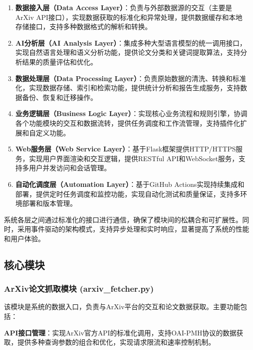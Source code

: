 \documentclass[12pt,a4paper]{article}
\begin{document}
\begin{enumerate}
    \item \textbf{数据接入层（Data Access Layer）}：负责与外部数据源的交互（主要是ArXiv API接口），实现数据获取的标准化和异常处理，提供数据缓存和本地存储接口，支持多种数据格式的解析和转换。
    
    \item \textbf{AI分析层（AI Analysis Layer）}：集成多种大型语言模型的统一调用接口，实现自然语言处理和语义分析功能，提供论文分类和关键词提取算法，支持分析结果的质量评估和优化。
    
    \item \textbf{数据处理层（Data Processing Layer）}：负责原始数据的清洗、转换和标准化，实现数据存储、索引和检索功能，提供统计分析和报告生成服务，支持数据备份、恢复和迁移操作。
    
    \item \textbf{业务逻辑层（Business Logic Layer）}：实现核心业务流程和规则引擎，协调各个功能模块的交互和数据流转，提供任务调度和工作流管理，支持插件化扩展和自定义功能。
    
    \item \textbf{Web服务层（Web Service Layer）}：基于Flask框架提供HTTP/HTTPS服务，实现用户界面渲染和交互逻辑，提供RESTful API和WebSocket服务，支持多用户并发访问和会话管理。
    
    \item \textbf{自动化调度层（Automation Layer）}：基于GitHub Actions实现持续集成和部署，提供定时任务调度和监控功能，实现自动化测试和质量保证，支持多环境部署和版本管理。
\end{enumerate}

系统各层之间通过标准化的接口进行通信，确保了模块间的松耦合和可扩展性。同时，采用事件驱动的架构模式，支持异步处理和实时响应，显著提高了系统的性能和用户体验。

\subsection{核心模块}

\subsubsection{ArXiv论文抓取模块 (arxiv\_fetcher.py)}
该模块是系统的数据入口，负责与ArXiv平台的交互和论文数据获取。主要功能包括：

\textbf{API接口管理}：实现ArXiv官方API的标准化调用，支持OAI-PMH协议的数据获取，提供多种查询参数的组合和优化，实现请求限流和速率控制机制。
\end{document}
